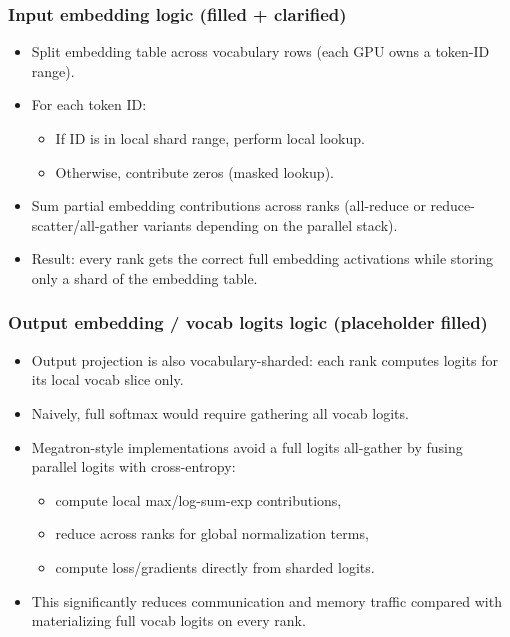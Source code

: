 \documentclass[11pt]{article}
\newcommand{\blue}[1]{\textcolor{myblue}{#1}}
\begin{document}
\subsubsection*{\blue{Input embedding logic (filled + clarified)}}
\begin{itemize}[leftmargin=1.2em]
\item Split embedding table across vocabulary rows (each GPU owns a token-ID range).
\item For each token ID:
  \begin{itemize}
  \item If ID is in local shard range, perform local lookup.
  \item Otherwise, contribute zeros (masked lookup).
  \end{itemize}
\item Sum partial embedding contributions across ranks (all-reduce or reduce-scatter/all-gather variants depending on the parallel stack).
\item Result: every rank gets the correct full embedding activations while storing only a shard of the embedding table.
\end{itemize}

\subsubsection*{\blue{Output embedding / vocab logits logic (placeholder filled)}}
\begin{itemize}[leftmargin=1.2em]
\item Output projection is also vocabulary-sharded: each rank computes logits for its local vocab slice only.
\item Naively, full softmax would require gathering all vocab logits.
\item Megatron-style implementations avoid a full logits all-gather by fusing parallel logits with cross-entropy:
  \begin{itemize}
  \item compute local max/log-sum-exp contributions,
  \item reduce across ranks for global normalization terms,
  \item compute loss/gradients directly from sharded logits.
  \end{itemize}
\item This significantly reduces communication and memory traffic compared with materializing full vocab logits on every rank.
\end{itemize}
\end{document}
